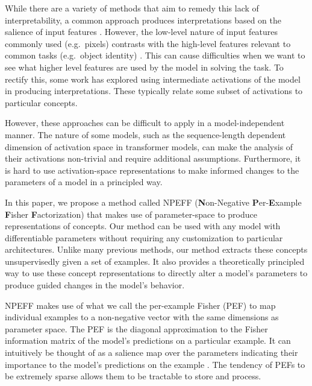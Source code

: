 \documentclass[dvipsnames]{article}
\begin{document}
While there are a variety of methods that aim to remedy this lack of interpretability, a common approach produces interpretations based on the salience of input features \citep{smilkov2017smoothgrad, dabkowski2017real, sundararajan2017axiomatic}.
However, the low-level nature of input features commonly used (e.g.\ pixels) contrasts with the high-level features relevant to common tasks (e.g.\ object identity) \citep{kim2018interpretability}.
This can cause difficulties when we want to see what higher level features are used by the model in solving the task.
To rectify this, some work has explored using intermediate activations of the model in producing interpretations.
These typically relate some subset of activations to particular concepts.

However, these approaches can be difficult to apply in a model-independent manner.
The nature of some models, such as the sequence-length dependent dimension of activation space in transformer models, can make the analysis of their activations non-trivial and require additional assumptions.
Furthermore, it is hard to use activation-space representations to make informed changes to the parameters of a model in a principled way.

In this paper, we propose a method called NPEFF (\textbf{N}on-Negative \textbf{P}er-\textbf{E}xample \textbf{F}isher \textbf{F}actorization) that makes use of parameter-space to produce representations of concepts.
Our method can be used with any model with differentiable parameters without requiring any customization to particular architectures.
Unlike many previous methods, our method extracts these concepts unsupervisedly given a set of examples.
It also provides a theoretically principled way to use these concept representations to directly alter a model's parameters to produce guided changes in the model's behavior.

NPEFF makes use of what we call the per-example Fisher (PEF) to map individual examples to a non-negative vector with the same dimensions as parameter space.
The PEF is the diagonal approximation to the Fisher information matrix \citep{fisher1922mathematical} of the model's predictions on a particular example.
It can intuitively be thought of as a salience map over the parameters indicating their importance to the model's predictions on the example \citep{kirkpatrick2017overcoming}.
The tendency of PEFs to be extremely sparse allows them to be tractable to store and process.
\end{document}
